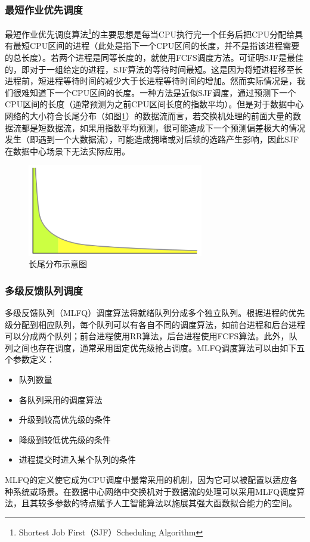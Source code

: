 \subsubsection{最短作业优先调度}
最短作业优先调度算法\footnote{Shortest Job First（SJF）Scheduling Algorithm}的主要思想是每当CPU执行完一个任务后把CPU分配给具有最短CPU区间的进程（此处是指下一个CPU区间的长度，并不是指该进程需要的总长度）。若两个进程是同等长度的，就使用FCFS调度方法。可证明SJF是最佳的，即对于一组给定的进程，SJF算法的等待时间最短。这是因为将短进程移至长进程前，短进程等待时间的减少大于长进程等待时间的增加\cite{OperatingSys}。然而实际情况是，我们很难知道下一个CPU区间的长度。一种方法是近似SJF调度，通过预测下一个CPU区间的长度（通常预测为之前CPU区间长度的指数平均）。但是对于数据中心网络的大小符合长尾分布（如图\ref{fig:long-tail}）的数据流而言，若交换机处理的前面大量的数据流都是短数据流，如果用指数平均预测，很可能造成下一个预测偏差极大的情况发生（即遇到一个大数据流），可能造成拥堵或对后续的选路产生影响，因此SJF在数据中心场景下无法实际应用。
\begin{figure}[ht]
\centering
\includegraphics[height=4cm]{figure/long_tail_distribution.png}
\caption{长尾分布示意图}
\label{fig:long-tail}
\end{figure}
\subsubsection{多级反馈队列调度}
多级反馈队列（MLFQ）调度算法将就绪队列分成多个独立队列。根据进程的优先级分配到相应队列，每个队列可以有各自不同的调度算法，如前台进程和后台进程可以分成两个队列；前台进程使用RR算法，后台进程使用FCFS算法。此外，队列之间也存在调度，通常采用固定优先级抢占调度。MLFQ调度算法可以由如下五个参数定义：
\begin{itemize}
    \item 队列数量
    \item 各队列采用的调度算法
    \item 升级到较高优先级的条件
    \item 降级到较低优先级的条件
    \item 进程提交时进入某个队列的条件
\end{itemize}
MLFQ的定义使它成为CPU调度中最常采用的机制，因为它可以被配置以适应各种系统或场景。在数据中心网络中交换机对于数据流的处理可以采用MLFQ调度算法，且其较多参数的特点赋予人工智能算法以施展其强大函数拟合能力的空间。
